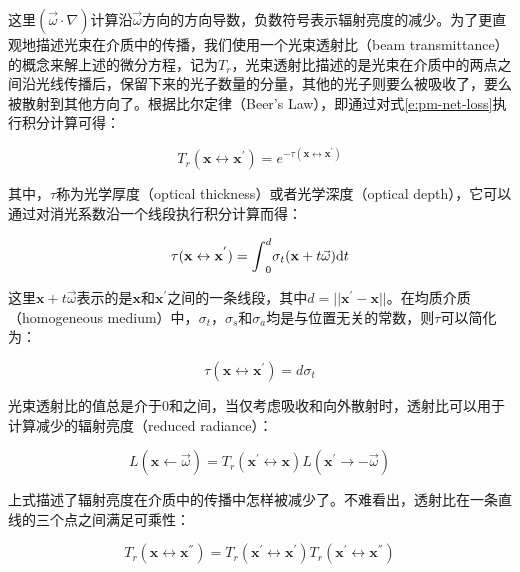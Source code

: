 \noindent 这里$(\vec{\omega}\cdot\nabla)$计算沿$\vec{\omega}$方向的方向导数，负数符号表示辐射亮度的减少。为了更直观地描述光束在介质中的传播，我们使用一个光束透射比（beam transmittance）的概念来解上述的微分方程，记为$T_r$，光束透射比描述的是光束在介质中的两点之间沿光线传播后，保留下来的光子数量的分量，其他的光子则要么被吸收了，要么被散射到其他方向了。根据比尔定律（Beer’s Law），即通过对式\ref{e:pm-net-loss}执行积分计算可得：

\begin{equation}\label{e:pm-transmittance}
	T_r(\mathbf{x}\leftrightarrow\mathbf{x}^{'})=e^{-\tau(\mathbf{x}\leftrightarrow\mathbf{x}^{'})}
\end{equation}

\noindent 其中，$\tau$称为光学厚度（optical thickness）或者光学深度（optical depth），它可以通过对消光系数沿一个线段执行积分计算而得：

\begin{equation}
	\tau(\mathbf{x}\leftrightarrow\mathbf{x}^{'})={\rm \int}^{d}_{0}\sigma_t(\mathbf{x}+t\vec{\omega}){\rm d}t
\end{equation}

\noindent 这里$\mathbf{x}+t\vec{\omega}$表示的是$\mathbf{x}$和$\mathbf{x}^{'}$之间的一条线段，其中$d=||\mathbf{x}^{'}-\mathbf{x}||$。在均质介质（homogeneous medium）中，$\sigma_t$，$\sigma_s$和$\sigma_a$均是与位置无关的常数，则$\tau$可以简化为：

\begin{equation}
	\tau(\mathbf{x}\leftrightarrow\mathbf{x}^{'})=d\sigma_t
\end{equation}

光束透射比的值总是介于0和之间，当仅考虑吸收和向外散射时，透射比可以用于计算减少的辐射亮度（reduced radiance）：

\begin{equation}
	L(\mathbf{x}\leftarrow\vec{\omega})=T_r(\mathbf{x}^{'}\leftrightarrow\mathbf{x})L(\mathbf{x}^{'}\to-\vec{\omega})
\end{equation}

\noindent 上式描述了辐射亮度在介质中的传播中怎样被减少了。不难看出，透射比在一条直线的三个点之间满足可乘性：

\begin{equation}
	T_r(\mathbf{x}\leftrightarrow\mathbf{x}^{''})=T_r(\mathbf{x}^{'}\leftrightarrow\mathbf{x}^{'})T_r(\mathbf{x}^{'}\leftrightarrow\mathbf{x}^{''})
\end{equation}

